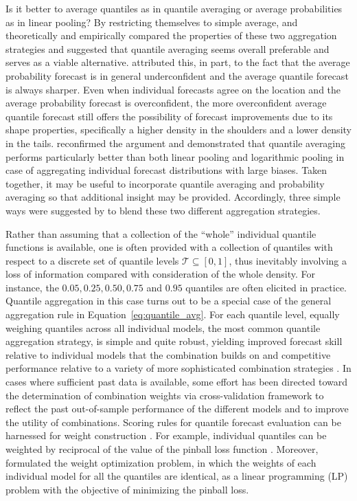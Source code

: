\documentclass[11pt]{article}
\begin{document}
Is it better to average quantiles as in quantile averaging or average probabilities as in linear pooling? By restricting themselves to simple average, \citet{Lichtendahl2013-rt} and \citet{Busetti2017-ox} theoretically and empirically compared the properties of these two aggregation strategies and suggested that quantile averaging seems overall preferable and serves as a viable alternative. \citet{Lichtendahl2013-rt} attributed this, in part, to the fact that the average probability forecast is in general underconfident and the average quantile forecast is always sharper. Even when individual forecasts agree on the location and the average probability forecast is overconfident, the more overconfident average quantile forecast still offers the possibility of forecast improvements due to its shape properties, specifically a higher density in the shoulders and a lower density in the tails. \citet{Busetti2017-ox} reconfirmed the argument and demonstrated that quantile averaging performs particularly better than both linear pooling and logarithmic pooling in case of aggregating individual forecast distributions with large biases. Taken together, it may be useful to incorporate quantile averaging and probability averaging so that additional insight may be provided. Accordingly, three simple ways were suggested by \citet{Lichtendahl2013-rt} to blend these two different aggregation strategies.

Rather than assuming that a collection of the ``whole'' individual quantile functions is available, one is often provided with a collection of quantiles with respect to a discrete set of quantile levels $\mathcal{T} \subseteq [0,1]$, thus inevitably involving a loss of information compared with consideration of the whole density. For instance, the $0.05, 0.25, 0.50, 0.75$ and $0.95$ quantiles are often elicited in practice. Quantile aggregation in this case turns out to be a special case of the general aggregation rule in Equation~\eqref{eq:quantile_avg}. For each quantile level, equally weighing quantiles across all individual models, the most common quantile aggregation strategy, is simple and quite robust, yielding improved forecast skill relative to individual models that the combination builds on and competitive performance relative to a variety of more sophisticated combination strategies \citep[e.g.,][]{Busetti2017-ox,Smyl2019-av,Brooks2020-sg,Ray2020-qg}. In cases where sufficient past data is available, some effort has been directed toward the determination of combination weights via cross-validation framework to reflect the past out-of-sample performance of the different models and to improve the utility of combinations. Scoring rules for quantile forecast evaluation can be harnessed for weight construction \citep{Gneiting2007-ij,Grushka-Cockayne2017-eg,Trapero2019-uh}. For example, individual quantiles can be weighted by reciprocal of the value of the pinball loss function \citep{Wang2019-lx,Zhang2020-dm}. Moreover, \citet{Wang2019-lx} formulated the weight optimization problem, in which the weights of each individual model for all the quantiles are identical, as a linear programming (LP) problem with the objective of minimizing the pinball loss.
\end{document}
